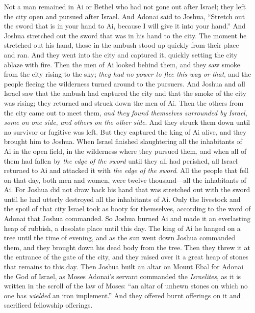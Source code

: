 \begin{biblechapter}
\verse Not a man remained in Ai or Bethel who had not gone out after Israel; they left the city open and pursued after Israel.
\verse And Adonai said to Joshua, “Stretch out the sword that is in your hand to Ai, because I will give it into your hand.” And Joshua stretched out the sword that was in his hand to the city.
\verse The moment he stretched out his hand, those in the ambush stood up quickly from their place and ran. And they went into the city and captured it, quickly setting the city ablaze with fire.
\verse Then the men of Ai looked behind them, and they saw smoke from the city rising to the sky; \textit{they had no power to flee this way or that}, and the people fleeing the wilderness turned around to the pursuers.
\verse And Joshua and all Israel saw that the ambush had captured the city and that the smoke of the city was rising; they returned and struck down the men of Ai.
\verse Then the others from the city came out to meet them, \textit{and they found themselves surrounded by Israel}, \textit{some on one side, and others on the other side}. And they struck them down until no survivor or fugitive was left.
\verse But they captured the king of Ai alive, and they brought him to Joshua.
\verse When Israel finished slaughtering all the inhabitants of Ai in the open field, in the wilderness where they pursued them, and when all of them had fallen by \textit{the edge of the sword} until they all had perished, all Israel returned to Ai and attacked it with \textit{the edge of the sword}.
\verse All the people that fell on that day, both men and women, were twelve thousand—all the inhabitants of Ai.
\verse For Joshua did not draw back his hand that was stretched out with the sword until he had utterly destroyed all the inhabitants of Ai.
\verse Only the livestock and the spoil of that city Israel took as booty for themselves, according to the word of Adonai that Joshua commanded.
\verse So Joshua burned Ai and made it an everlasting heap of rubbish, a desolate place until this day.
\verse The king of Ai he hanged on a tree until the time of evening, and as the sun went down Joshua commanded them, and they brought down his dead body from the tree. Then they threw it at the entrance of the gate of the city, and they raised over it a great heap of stones that remains to this day.
 Then Joshua built an altar on Mount Ebal for Adonai the God of Israel,
\verse as Moses Adonai’s servant commanded the \textit{Israelites}, as it is written in the scroll of the law of Moses: “an altar of unhewn stones on which no one has \textit{wielded} an iron implement.” And they offered burnt offerings on it and sacrificed fellowship offerings.

\end{biblechapter}
